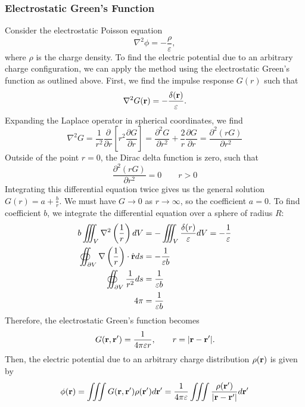 \subsubsection{Electrostatic Green's Function}
Consider the electrostatic Poisson equation
\begin{equation}
	\nabla^2 \phi = -\frac{\rho}{\varepsilon},
\end{equation}
where $\rho$ is the charge density. To find the electric potential due to an arbitrary charge configuration, we can apply the method using the electrostatic Green's function as outlined above. First, we find the impulse response $G(r)$ such that
\begin{equation}
	\nabla^2 G(\mathbf{r}) = -\frac{\delta(\mathbf{r})}{\varepsilon}.
\end{equation}
Expanding the Laplace operator in spherical coordinates, we find
\begin{equation*}
	\nabla^2 G = \frac{1}{r^2} \frac{\partial}{\partial r} \left[ r^2 \frac
	{\partial G}{\partial r} \right] = \frac{\partial^2 G}{\partial r^2} + \frac{2}{r} \frac{\partial G}{\partial r} = \frac{\partial^2 (r G)}{\partial r^2}
\end{equation*}
Outside of the point $r = 0$, the Dirac delta function is zero, such that
\begin{equation}
	\frac{\partial^2 (r G)}{\partial r^2} = 0 \qquad r > 0
\end{equation}
Integrating this differential equation twice gives us the general solution $G(r) = a + \frac{b}{r}$. We must have $G \to 0$ as $r \to \infty$, so the coefficient $a = 0$. To find coefficient $b$, we integrate the differential equation over a sphere of radius $R$:
\begin{align*}
	b \iiint_{V} \nabla^2 \left( \frac{1}{r} \right) dV & = - \iiint_V \frac{\delta(r)}{\varepsilon} dV = -\frac{1}{\varepsilon} \\
	\oiint_{\partial V} \nabla \left( \frac{1}{r} \right) \cdot \hat{\mathbf{r}} ds & = -\frac{1}{\varepsilon b} \\
	\oiint_{\partial V} \frac{1}{r^2} ds & = \frac{1}{\varepsilon b} \\
	4\pi & = \frac{1}{\varepsilon b}
\end{align*}
Therefore, the electrostatic Green's function becomes
\begin{equation}
	G(\mathbf{r}, \mathbf{r}^\prime) = \frac{1}{4\pi \varepsilon r}, \qquad r = |\mathbf{r} - \mathbf{r}^\prime|.
\end{equation}
Then, the electric potential due to an arbitrary charge distribution $\rho(\mathbf{r})$ is given by
\begin{equation}
	\phi(\mathbf{r}) = \iiint G(\mathbf{r}, \mathbf{r}^\prime) \rho(\mathbf{r}^\prime) d\mathbf{r}^\prime = \frac{1}{4\pi\varepsilon} \iiint \frac{\rho(\mathbf{r}^\prime)}{|\mathbf{r} - \mathbf{r}^\prime|} d\mathbf{r}^\prime
\end{equation}

